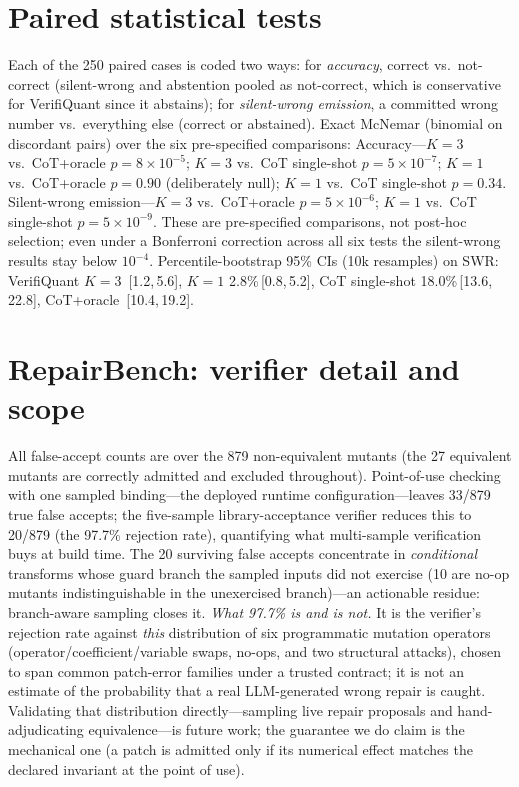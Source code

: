 \section{Paired statistical tests}\label{app:stats}
Each of the 250 paired cases is coded two ways: for \emph{accuracy}, correct vs.\ not-correct (silent-wrong and abstention pooled as not-correct, which is conservative for VerifiQuant since it abstains); for \emph{silent-wrong emission}, a committed wrong number vs.\ everything else (correct or abstained).
Exact McNemar (binomial on discordant pairs) over the six pre-specified comparisons:
Accuracy---$K{=}3$ vs.\ CoT+oracle $p{=}8{\times}10^{-5}$; $K{=}3$ vs.\ CoT single-shot $p{=}5{\times}10^{-7}$; $K{=}1$ vs.\ CoT+oracle $p{=}0.90$ (deliberately null); $K{=}1$ vs.\ CoT single-shot $p{=}0.34$.
Silent-wrong emission---$K{=}3$ vs.\ CoT+oracle $p{=}5{\times}10^{-6}$; $K{=}1$ vs.\ CoT single-shot $p{=}5{\times}10^{-9}$.
These are pre-specified comparisons, not post-hoc selection; even under a Bonferroni correction across all six tests the silent-wrong results stay below $10^{-4}$.
Percentile-bootstrap 95\% CIs (10k resamples) on SWR: VerifiQuant $K{=}3$ \vqSWRAll{}\,[1.2,\,5.6], $K{=}1$ 2.8\%\,[0.8,\,5.2], CoT single-shot 18.0\%\,[13.6,\,22.8], CoT+oracle \cotoSWRAll{}\,[10.4,\,19.2].

\section{RepairBench: verifier detail and scope}\label{app:repairbench}
All false-accept counts are over the 879 non-equivalent mutants (the 27 equivalent mutants are correctly admitted and excluded throughout). Point-of-use checking with one sampled binding---the deployed runtime configuration---leaves 33/879 true false accepts; the five-sample library-acceptance verifier reduces this to 20/879 (the 97.7\% rejection rate), quantifying what multi-sample verification buys at build time.
The 20 surviving false accepts concentrate in \emph{conditional} transforms whose guard branch the sampled inputs did not exercise (10 are no-op mutants indistinguishable in the unexercised branch)---an actionable residue: branch-aware sampling closes it.
\emph{What 97.7\% is and is not.} It is the verifier's rejection rate against \emph{this} distribution of six programmatic mutation operators (operator/coefficient/variable swaps, no-ops, and two structural attacks), chosen to span common patch-error families under a trusted contract; it is not an estimate of the probability that a real LLM-generated wrong repair is caught. Validating that distribution directly---sampling live repair proposals and hand-adjudicating equivalence---is future work; the guarantee we do claim is the mechanical one (a patch is admitted only if its numerical effect matches the declared invariant at the point of use).

